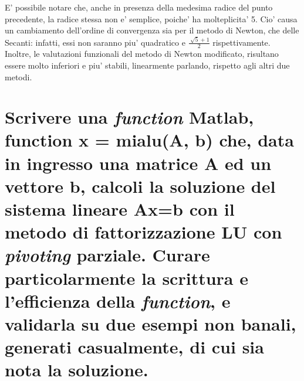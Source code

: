 \documentclass[10pt,a4paper]{article}
\begin{document}
E' possibile notare che, anche in presenza della medesima radice del punto precedente, la radice stessa non e' semplice, poiche'
ha molteplicita' 5. Cio' causa un cambiamento dell'ordine di convergenza sia per il metodo di Newton, che delle Secanti: infatti,
essi non saranno piu' quadratico e $ \frac{\sqrt[]{5}+1}{2} $ rispettivamente. \\
Inoltre, le valutazioni funzionali del metodo di Newton modificato, risultano essere molto inferiori e piu' stabili,
linearmente parlando, rispetto agli altri due metodi.


\section{Scrivere una \textit{function} Matlab, function x = mialu(A, b) che, data in ingresso una matrice \textbf{A} ed un vettore \textbf{b},
  calcoli la soluzione del sistema lineare \textbf{Ax=b} con il metodo di fattorizzazione LU con \textit{pivoting} parziale.
  Curare particolarmente la scrittura e l'efficienza della \textit{function}, e validarla su due esempi non banali, generati casualmente,
  di cui sia nota la soluzione.}
\end{document}
